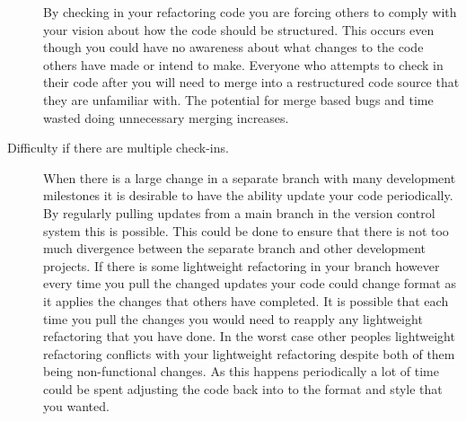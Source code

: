 \begin{description}
By checking in your refactoring code you are forcing others to comply with your vision about how the code should be structured.  This occurs even though you could have no awareness about what changes to the code others have made or intend to make.  Everyone who attempts to check in their code after you will need to merge into a restructured code source that they are unfamiliar with.  The potential for merge based bugs and time wasted doing unnecessary merging increases.

% 
% 
% 
% 
% 
% 
\item [Difficulty if there are multiple check-ins.] 
When there is a large change in a separate branch with many development milestones it is desirable to have the ability update your code periodically.  
By regularly pulling updates from a main branch in the version control system this is possible.
This could be done to ensure that there is not too much divergence between the separate branch and other development projects.
If there is some lightweight refactoring in your branch however every time you pull the changed updates your code could change format as it applies the changes that others have completed.
It is possible that each time you pull the changes you would need to reapply any lightweight refactoring that you have done.
In the worst case other peoples lightweight refactoring conflicts with your lightweight refactoring despite both of them being non-functional changes.
As this happens periodically a  lot of time could be spent adjusting the code back into to the format and style that you wanted. 



\end{description}
